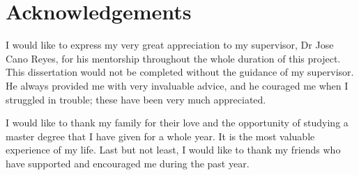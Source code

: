 \section*{Acknowledgements}
    I would like to express my very great appreciation to my supervisor,
    Dr Jose Cano Reyes, for his mentorship throughout the whole duration of this project.
    This dissertation would not be completed without the guidance of my supervisor.
    He always provided me with very invaluable advice,
    and he couraged me when I struggled in trouble;
    these have been very much appreciated.

    I would like to thank my family for their love and the opportunity of studying a master degree that I have given for a whole year. It is the most valuable experience of my life.
    Last but not least, I would like to thank my friends who have supported and encouraged me during
    the past year.